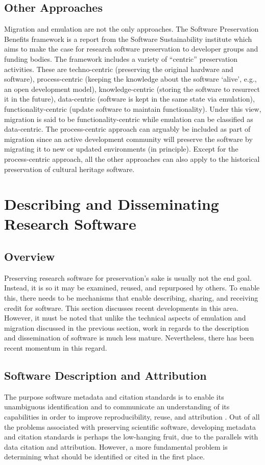 \documentclass[letterpaper,11pt]{article}
\begin{document}
\subsection{Other Approaches}
Migration and emulation are not the only approaches. The Software Preservation Benefits framework \citep{hong2010} is a report from the Software Sustainability institute which aims to make the case for research software preservation to developer groups and funding bodies. The framework includes a variety of ``centric'' preservation activities. These are techno-centric (preserving the original hardware and software), process-centric (keeping the knowledge about the software `alive', e.g., an open development model), knowledge-centric (storing the software to resurrect it in the future), data-centric (software is kept in the same state via emulation), functionality-centric (update software to maintain functionality). Under this view, migration is said to be functionality-centric while emulation can be classified as data-centric. The process-centric approach can arguably be included as part of migration since an active development community will preserve the software by migrating it to new or updated environments (in principle). Except for the process-centric approach, all the other approaches can also apply to the historical preservation of cultural heritage software. 

\section{Describing and Disseminating Research Software}
\subsection{Overview}
Preserving research software for preservation's sake is usually not the end goal. Instead, it is so it may be examined, reused, and repurposed by others. To enable this, there needs to be mechanisms that enable describing, sharing, and receiving credit for software. This section discusses recent developments in this area. However, it must be noted that unlike the technical aspects of emulation and migration discussed in the previous section, work in regards to the description and dissemination of software is much less mature. Nevertheless, there has been recent momentum in this regard.

\subsection{Software Description and Attribution}
The purpose software metadata and citation standards is to enable its unambiguous identification and to communicate an understanding of its capabilities in order to improve reproducibility, reuse, and attribution \citep{hong2014,jackson2012}.  Out of all the problems associated with preserving scientific software, developing metadata and citation standards is perhaps the low-hanging fruit, due to the parallels with data citation and attribution. However, a more fundamental problem is determining what should be identified or cited in the first place.
\end{document}
